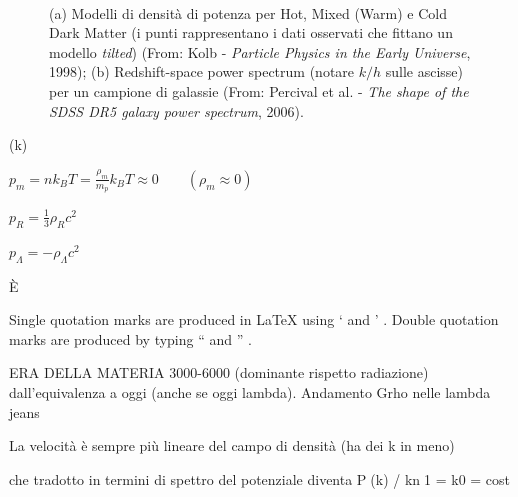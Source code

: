 \begin{figure}[H]
    $\;\;$
    \caption{(a) Modelli di densità di potenza per Hot, Mixed (Warm) e Cold Dark Matter (i punti rappresentano i dati osservati che fittano un modello \textit{tilted}) (From: Kolb - \textit{Particle Physics in the Early Universe}, 1998); (b) Redshift-space power spectrum (notare $k/h$ sulle ascisse) per un campione di galassie (From: Percival et al. - \textit{The shape of the SDSS DR5 galaxy power spectrum}, 2006).} \label{fig8:bella3} 
\end{figure}


\hslash
{}(k)

\begin{example}
$p_m=nk_B T = \frac{\rho_m}{m_p}k_B T \approx 0 \qquad ( \rho_m \approx 0) $
\end{example}
\begin{example}
$p_R=\frac{1}{3} \rho_R c^2 $
\end{example}
\begin{example}
$p_\Lambda= -\rho_\Lambda c^2 $
\end{example}



È

Single quotation marks are produced in LaTeX using ` and ' . Double quotation marks are produced by typing `` and '' .



ERA DELLA MATERIA 3000-6000 (dominante rispetto radiazione)  dall'equivalenza a oggi (anche se oggi lambda).
Andamento Grho nelle lambda jeans

La velocità è sempre più lineare del campo di densità (ha dei k in meno)


che tradotto in termini di spettro del potenziale diventa
P(k) / kn􀀀1 = k0 = cost